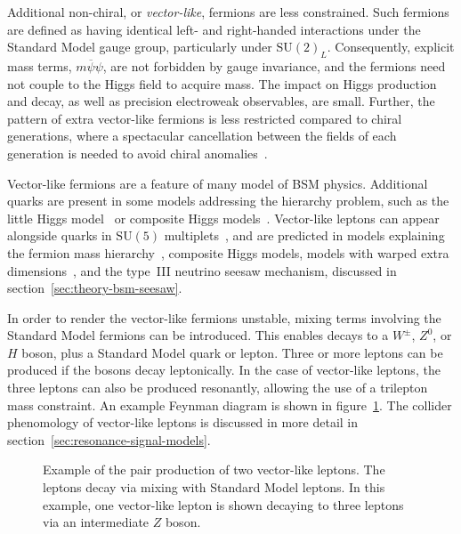 Additional non-chiral, or \emph{vector-like}, fermions are less constrained. Such fermions are defined as having identical left- and right-handed interactions under the Standard Model gauge group, particularly under $\mathrm{SU}(2)_L$. Consequently, explicit mass terms, $m\overline{\psi}\psi$, are not forbidden by gauge invariance, and the fermions need not couple to the Higgs field to acquire mass. The impact on Higgs production and decay, as well as precision electroweak observables, are small. Further, the pattern of extra vector-like fermions is less restricted compared to chiral generations, where a spectacular cancellation between the fields of each generation is needed to avoid chiral anomalies~\cite{Geng:1988pr}. 

Vector-like fermions are a feature of many model of BSM physics. Additional quarks are present in some models addressing the hierarchy problem, such as the little Higgs model~\cite{Arkani-Hamed:557546} or composite Higgs models~\cite{Kaplan:148688}. Vector-like leptons can appear alongside quarks in $\mathrm{SU}(5)$ multiplets~\cite{Martin:2012dx}, and are predicted in models explaining the fermion mass hierarchy~\cite{Falkowski:2014hs}, composite Higgs models, models with warped extra dimensions~\cite{Redi:2013ib,Contino:1005586}, and the type~III neutrino seesaw mechanism, discussed in section~\ref{sec:theory-bsm-seesaw}. 

In order to render the vector-like fermions unstable, mixing terms involving the Standard Model fermions can be introduced. This enables decays to a $W^{\pm}$, $Z^0$, or $H$ boson, plus a Standard Model quark or lepton. Three or more leptons can be produced if the bosons decay leptonically. In the case of vector-like leptons, the three leptons can also be produced resonantly, allowing the use of a trilepton mass constraint. An example Feynman diagram is shown in figure~\ref{fig:theory-heavy-lepton-feynman-diagrams-cc}. The collider phenomology of vector-like leptons is discussed in more detail in section~\ref{sec:resonance-signal-models}.

\begin{figure}[htbp]
	\centering
	\caption{Example of the pair production of two vector-like leptons. The leptons decay via mixing with Standard Model leptons. In this example, one vector-like lepton is shown decaying to three leptons via an intermediate $Z$ boson.}
	\label{fig:theory-heavy-lepton-feynman-diagrams-cc}
\end{figure}

